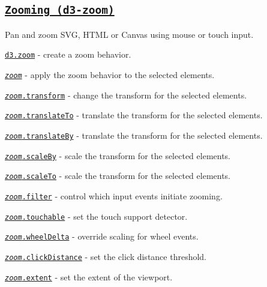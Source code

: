\subsection*{\href{https://github.com/d3/d3-zoom}{\tt Zooming (d3-\/zoom)}}

Pan and zoom S\+VG, H\+T\+ML or Canvas using mouse or touch input.


\begin{DoxyItemize}
\item \href{https://github.com/d3/d3-zoom/blob/master/README.md#zoom}{\tt d3.\+zoom} -\/ create a zoom behavior.
\item \href{https://github.com/d3/d3-zoom/blob/master/README.md#_zoom}{\tt {\itshape zoom}} -\/ apply the zoom behavior to the selected elements.
\item \href{https://github.com/d3/d3-zoom/blob/master/README.md#zoom_transform}{\tt {\itshape zoom}.transform} -\/ change the transform for the selected elements.
\item \href{https://github.com/d3/d3-zoom/blob/master/README.md#zoom_translateTo}{\tt {\itshape zoom}.translate\+To} -\/ translate the transform for the selected elements.
\item \href{https://github.com/d3/d3-zoom/blob/master/README.md#zoom_translateBy}{\tt {\itshape zoom}.translate\+By} -\/ translate the transform for the selected elements.
\item \href{https://github.com/d3/d3-zoom/blob/master/README.md#zoom_scaleBy}{\tt {\itshape zoom}.scale\+By} -\/ scale the transform for the selected elements.
\item \href{https://github.com/d3/d3-zoom/blob/master/README.md#zoom_scaleTo}{\tt {\itshape zoom}.scale\+To} -\/ scale the transform for the selected elements.
\item \href{https://github.com/d3/d3-zoom/blob/master/README.md#zoom_filter}{\tt {\itshape zoom}.filter} -\/ control which input events initiate zooming.
\item \href{https://github.com/d3/d3-zoom/blob/master/README.md#zoom_touchable}{\tt {\itshape zoom}.touchable} -\/ set the touch support detector.
\item \href{https://github.com/d3/d3-zoom/blob/master/README.md#zoom_wheelDelta}{\tt {\itshape zoom}.wheel\+Delta} -\/ override scaling for wheel events.
\item \href{https://github.com/d3/d3-zoom/blob/master/README.md#zoom_clickDistance}{\tt {\itshape zoom}.click\+Distance} -\/ set the click distance threshold.
\item \href{https://github.com/d3/d3-zoom/blob/master/README.md#zoom_extent}{\tt {\itshape zoom}.extent} -\/ set the extent of the viewport.

\end{DoxyItemize}
